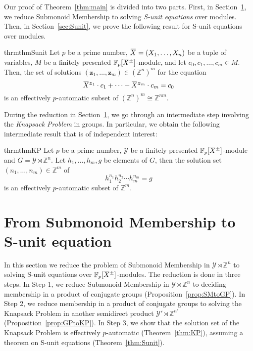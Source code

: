 \documentclass[a4paper,UKenglish,cleveref, autoref, thm-restate]{lipics-v2021}
\newcommand{\Z}{\mathbb{Z}}
\newcommand{\F}{\mathbb{F}}
\newcommand{\mY}{\mathcal{Y}}
\newcommand{\bz}{\boldsymbol{z}}
\newcommand{\oX}{\mkern 1.5mu\overline{\mkern-1.5mu X \mkern-1.5mu}\mkern 1.5mu}
\theoremstyle{definition}
\theoremstyle{definition}
\theoremstyle{definition}
\begin{document}
Our proof of Theorem~\ref{thm:main} is divided into two parts.
First, in Section~\ref{sec:SMtoSunit}, we reduce Submonoid Membership to solving \emph{S-unit equations} over modules. 
Then, in Section~\ref{sec:Sunit}, we prove the following result for S-unit equations over modules.

\begin{restatable}{thrm}{thmSunit}\label{thm:Sunit}
    Let $p$ be a prime number, $\oX = (X_1, \ldots, X_n)$ be a tuple of variables, $M$ be a finitely presented $\F_p[\oX^{\pm}]$-module, and let $c_0, c_1, \ldots, c_m \in M$.
    Then, the set of solutions $(\bz_1, \ldots, \bz_m) \in \left(\Z^{n}\right)^{m}$ for the equation
    \begin{equation}\label{eq:Sunitori}
        \oX^{\bz_1} \cdot c_1 + \cdots + \oX^{\bz_m} \cdot c_m = c_0
    \end{equation}
    is an effectively $p$-automatic subset of $\left(\Z^{n}\right)^{m} \cong \Z^{nm}$.
\end{restatable}

During the reduction in Section~\ref{sec:SMtoSunit}, we go through an intermediate step involving the \emph{Knapsack Problem} in groups. In particular, we obtain the following intermediate result that is of independent interest:

\begin{restatable}{thrm}{thmKP}\label{thm:KP}
    Let $p$ be a prime number, $\mY$ be a finitely presented $\F_p[\oX^{\pm}]$-module and $G = \mY \rtimes \Z^n$. 
    Let $h_1, \ldots, h_m, g$ be elements of $G$, then the solution set $(n_1, \ldots, n_m) \in \Z^m$ of
    \begin{equation}\label{eq:KP}
        h_1^{n_1} h_2^{n_2} \cdots h_m^{n_m} = g
    \end{equation}
    is an effectively $p$-automatic subset of $\Z^m$.
\end{restatable}

\section{From Submonoid Membership to S-unit equation}\label{sec:SMtoSunit}

In this section we reduce the problem of Submonoid Membership in $\mY \rtimes \Z^n$ to solving S-unit equations over $\F_p[\oX^{\pm}]$-modules.
The reduction is done in three steps. In Step 1, we reduce Submonoid Membership in $\mY \rtimes \Z^n$ to deciding membership in a product of conjugate groups (Proposition~\ref{prop:SMtoGP}). In Step 2, we reduce membership in a product of conjugate groups to solving the Knapsack Problem in another semidirect product $\mY' \rtimes \Z^{n'}$ (Proposition~\ref{prop:GPtoKP}). In Step 3, we show that the solution set of the Knapsack Problem is effectively $p$-automatic (Theorem~\ref{thm:KP}), assuming a theorem on S-unit equations (Theorem~\ref{thm:Sunit}).
\end{document}
